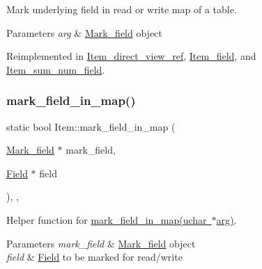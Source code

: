Mark underlying field in read or write map of a table.


\begin{DoxyParams}{Parameters}
{\em arg} & \mbox{\hyperlink{classMark__field}{Mark\+\_\+field}} object \\
\hline
\end{DoxyParams}


Reimplemented in \mbox{\hyperlink{classItem__direct__view__ref_a82d411e16d677c1a1eead5c386f6bdd0}{Item\+\_\+direct\+\_\+view\+\_\+ref}}, \mbox{\hyperlink{classItem__field_a45e7c96e69477dfa28d0004321285cb8}{Item\+\_\+field}}, and \mbox{\hyperlink{classItem__sum__num__field_a2c9ebf8dd31a83c22860bcb2c68c8c60}{Item\+\_\+sum\+\_\+num\+\_\+field}}.

\mbox{\label{classItem_adc95ed16596a556875d6272aeacbc2c0}} 
\subsubsection{\texorpdfstring{mark\+\_\+field\+\_\+in\+\_\+map()}{mark\_field\_in\_map()}\hspace{0.1cm}{\footnotesize\ttfamily [2/2]}}
{\footnotesize\ttfamily static bool Item\+::mark\+\_\+field\+\_\+in\+\_\+map (\begin{DoxyParamCaption}\item[{\mbox{\hyperlink{classMark__field}{Mark\+\_\+field}} $\ast$}]{mark\+\_\+field,  }\item[{\mbox{\hyperlink{classField}{Field}} $\ast$}]{field }\end{DoxyParamCaption})\hspace{0.3cm}{\ttfamily [inline]}, {\ttfamily [static]}, {\ttfamily [protected]}}

Helper function for \mbox{\hyperlink{classItem_ada2ce79ccf5ef1273b9e1654448944c1}{mark\+\_\+field\+\_\+in\+\_\+map(uchar $\ast$arg)}}.


\begin{DoxyParams}{Parameters}
{\em mark\+\_\+field} & \mbox{\hyperlink{classMark__field}{Mark\+\_\+field}} object \\
\hline
{\em field} & \mbox{\hyperlink{classField}{Field}} to be marked for read/write \\
\hline
\end{DoxyParams}
\mbox{\label{classItem_a0cd3592a280aa2306ea9abfeae3f632b}} 
